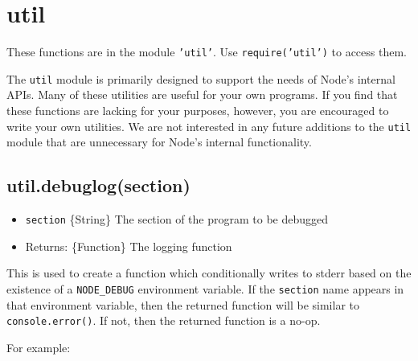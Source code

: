 \section{util}

\begin{Shaded}
\begin{Highlighting}[]
\NormalTok{: } 
\end{Highlighting}
\end{Shaded}

These functions are in the module \texttt{'util'}. Use
\texttt{require('util')} to access them.

The \texttt{util} module is primarily designed to support the needs of
Node's internal APIs. Many of these utilities are useful for your own
programs. If you find that these functions are lacking for your
purposes, however, you are encouraged to write your own utilities. We
are not interested in any future additions to the \texttt{util} module
that are unnecessary for Node's internal functionality.

\subsection{util.debuglog(section)}

\begin{itemize}
\item
  \texttt{section} \{String\} The section of the program to be debugged
\item
  Returns: \{Function\} The logging function
\end{itemize}

This is used to create a function which conditionally writes to stderr
based on the existence of a \texttt{NODE\_DEBUG} environment variable.
If the \texttt{section} name appears in that environment variable, then
the returned function will be similar to \texttt{console.error()}. If
not, then the returned function is a no-op.

For example:

\begin{Shaded}
\end{Shaded}

